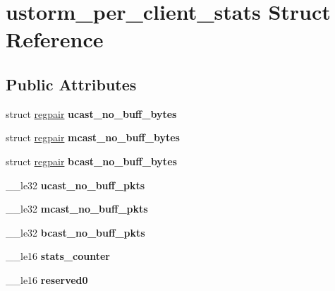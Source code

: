\hypertarget{structustorm__per__client__stats}{
\section{ustorm\_\-per\_\-client\_\-stats Struct Reference}
\label{structustorm__per__client__stats}
}
\subsection*{Public Attributes}
\begin{DoxyCompactItemize}
\item 
\hypertarget{structustorm__per__client__stats_ac06ac5706d1037e6a8f0c7759e8353a7}{
struct \hyperlink{structregpair}{regpair} {\bfseries ucast\_\-no\_\-buff\_\-bytes}}
\label{structustorm__per__client__stats_ac06ac5706d1037e6a8f0c7759e8353a7}

\item 
\hypertarget{structustorm__per__client__stats_a38242043094d6e7cd00da0bedd830bb3}{
struct \hyperlink{structregpair}{regpair} {\bfseries mcast\_\-no\_\-buff\_\-bytes}}
\label{structustorm__per__client__stats_a38242043094d6e7cd00da0bedd830bb3}

\item 
\hypertarget{structustorm__per__client__stats_af30c348aa99ab29ac974b167fcf921bf}{
struct \hyperlink{structregpair}{regpair} {\bfseries bcast\_\-no\_\-buff\_\-bytes}}
\label{structustorm__per__client__stats_af30c348aa99ab29ac974b167fcf921bf}

\item 
\hypertarget{structustorm__per__client__stats_a1c201a6a6b8d660bc86e2db846a0ec67}{
\_\-\_\-le32 {\bfseries ucast\_\-no\_\-buff\_\-pkts}}
\label{structustorm__per__client__stats_a1c201a6a6b8d660bc86e2db846a0ec67}

\item 
\hypertarget{structustorm__per__client__stats_a7ce7223dbabcdf6900585eef29916ac5}{
\_\-\_\-le32 {\bfseries mcast\_\-no\_\-buff\_\-pkts}}
\label{structustorm__per__client__stats_a7ce7223dbabcdf6900585eef29916ac5}

\item 
\hypertarget{structustorm__per__client__stats_a5924340c65b97d7fcf83c366195ab3c7}{
\_\-\_\-le32 {\bfseries bcast\_\-no\_\-buff\_\-pkts}}
\label{structustorm__per__client__stats_a5924340c65b97d7fcf83c366195ab3c7}

\item 
\hypertarget{structustorm__per__client__stats_aa4c9e2c55c513ad13f7f16ee1eb1fe8c}{
\_\-\_\-le16 {\bfseries stats\_\-counter}}
\label{structustorm__per__client__stats_aa4c9e2c55c513ad13f7f16ee1eb1fe8c}

\item 
\hypertarget{structustorm__per__client__stats_a17d8ae41f119a3fa2832a369057b4f3d}{
\_\-\_\-le16 {\bfseries reserved0}}
\label{structustorm__per__client__stats_a17d8ae41f119a3fa2832a369057b4f3d}

\end{DoxyCompactItemize}


